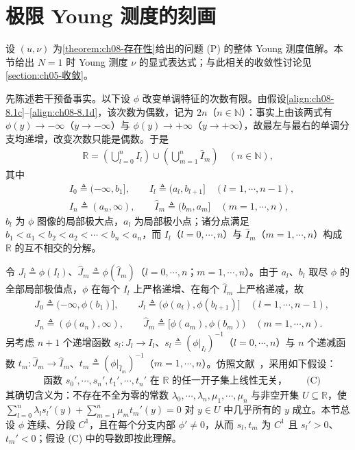 \documentclass[../../main.tex]{subfiles}%
\begin{document}
\section{极限 Young 测度的刻画}\label{section:ch08-测度刻画}

设 $(u,\nu)$ 为\cref{theorem:ch08-存在性}给出的问题 (P) 的整体 Young 测度值解。本节给出 $N=1$ 时 Young 测度 $\nu$ 的显式表达式；与此相关的收敛性讨论见\cref{section:ch05-收敛}。

先陈述若干预备事实。以下设 $\phi$ 改变单调特征的次数有限。由假设\eqref{align:ch08-8.1c}--\eqref{align:ch08-8.1d}，该次数为偶数，记为 $2n$（$n\in\mathbb{N}$）：事实上由该两式有 $\phi(y)\to-\infty$（$y\to-\infty$）与 $\phi(y)\to+\infty$（$y\to+\infty$），故最左与最右的单调分支均递增，改变次数只能是偶数。于是
\begin{align}
\mathbb{R}=\left(\bigcup_{l=0}^n I_l\right)\cup\left(\bigcup_{m=1}^n\widehat I_m\right)\quad(n\in\mathbb{N}), \label{align:ch08-8.96}
\end{align}
其中
\begin{align*}
&I_0\triangleq (-\infty,b_1],\qquad I_l\triangleq (a_l,b_{l+1}]\quad(l=1,\cdots ,n-1),\\
&I_n\triangleq (a_n,\infty),\qquad \widehat I_m\triangleq (b_m,a_m]\quad(m=1,\cdots ,n),
\end{align*}
$b_l$ 为 $\phi$ 图像的局部极大点，$a_l$ 为局部极小点；诸分点满足 $b_1<a_1<b_2<a_2<\cdots <b_n<a_n$，而 $I_l$（$l=0,\cdots ,n$）与 $\widehat I_m$（$m=1,\cdots ,n$）构成 $\mathbb{R}$ 的互不相交的分解。

令 $J_l\triangleq\phi(I_l)$、$\widehat J_m\triangleq\phi(\widehat I_m)$（$l=0,\cdots ,n$；$m=1,\cdots ,n$）。由于 $a_l$、$b_l$ 取尽 $\phi$ 的全部局部极值点，$\phi$ 在每个 $I_l$ 上严格递增、在每个 $\widehat I_m$ 上严格递减，故
\begin{align*}
&J_0\triangleq (-\infty,\phi(b_1)],\qquad J_l\triangleq (\phi(a_l),\phi(b_{l+1})]\quad(l=1,\cdots ,n-1),\\
&J_n\triangleq (\phi(a_n),\infty),\qquad \widehat J_m\triangleq [\phi(a_m),\phi(b_m))\quad(m=1,\cdots ,n).
\end{align*}
另考虑 $n+1$ 个递增函数 $s_l:J_l\to I_l$、$s_l\triangleq(\phi|_{I_l})^{-1}$（$l=0,\cdots ,n$）与 $n$ 个递减函数 $t_m:\widehat J_m\to\widehat I_m$、$t_m\triangleq(\phi|_{\widehat I_m})^{-1}$（$m=1,\cdots ,n$）。仿照文献~\cite{ref83}，采用如下假设：
\begin{align*}
&\text{函数 }s_0',\cdots ,s_n',t_1',\cdots ,t_n'\text{ 在 }\mathbb{R}\text{ 的任一开子集上线性无关，}\qquad\text{(C)}
\end{align*}
其确切含义为：不存在不全为零的常数 $\lambda_0,\cdots ,\lambda_n,\mu_1,\cdots ,\mu_n$ 与非空开集 $U\subseteq\mathbb{R}$，使 $\sum_{l=0}^n\lambda_l s_l'(y)+\sum_{m=1}^n\mu_m t_m'(y)=0$ 对 $y\in U$ 中几乎所有的 $y$ 成立。本节总设 $\phi$ 连续、分段 $C^1$，且在每个分支内部 $\phi'\neq0$，从而 $s_l,t_m$ 为 $C^1$ 且 $s_l'>0$、$t_m'<0$；假设 (C) 中的导数即按此理解。
\end{document}
